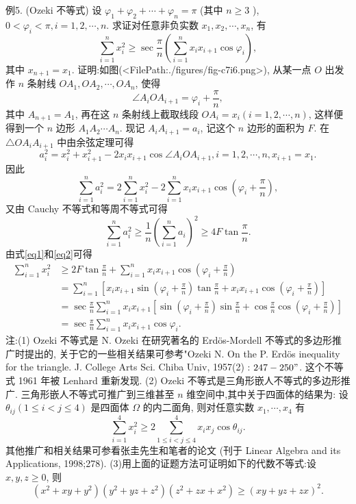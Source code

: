 例5. (Ozeki 不等式) 设 $\varphi_1+\varphi_2+\cdots+\varphi_n=\pi$ (其中 $n \geqslant 3$ ), $0<\varphi_i< \pi, i=1,2, \cdots, n$. 求证对任意非负实数 $x_1, x_2, \cdots, x_n$, 有
$$
\sum_{i=1}^n x_i^2 \geqslant \sec \frac{\pi}{n}\left(\sum_{i=1}^n x_i x_{i+1} \cos \varphi_i\right),
$$
其中 $x_{n+1}=x_1$.
证明:如图(<FilePath:./figures/fig-c7i6.png>), 从某一点 $O$ 出发作 $n$ 条射线 $O A_1, O A_2, \cdots, O A_n$, 使得
$$
\angle A_i O A_{i+1}=\varphi_i+\frac{\pi}{n},
$$
其中 $A_{n+1}=A_1$, 再在这 $n$ 条射线上截取线段 $O A_i=x_i(i=1,2, \cdots, n)$, 这样便得到一个 $n$ 边形 $A_1 A_2 \cdots A_n$.
现记 $A_i A_{i+1}=a_i$, 记这个 $n$ 边形的面积为 $F$.
在 $\triangle O A_i A_{i+1}$ 中由余弦定理可得
$$
a_i^2=x_i^2+x_{i+1}^2-2 x_i x_{i+1} \cos \angle A_i O A_{i+1}, i=1,2, \cdots, n, x_{i+1}=x_1 .
$$
因此
$$
\sum_{i=1}^n a_i^2=2 \sum_{i=1}^n x_i^2-2 \sum_{i=1}^n x_i x_{i+1} \cos \left(\varphi_i+\frac{\pi}{n}\right), \label{eq1}
$$
又由 Cauchy 不等式和等周不等式可得
$$
\sum_{i=1}^n a_i^2 \geqslant \frac{1}{n}\left(\sum_{i=1}^n a_i\right)^2 \geqslant 4 F \tan \frac{\pi}{n} . \label{eq2}
$$
由式\ref{eq1}和\ref{eq2}可得
$$
\begin{aligned}
\sum_{i=1}^n x_i^2 & \geqslant 2 F \tan \frac{\pi}{n}+\sum_{i=1}^n x_i x_{i+1} \cos \left(\varphi_i+\frac{\pi}{n}\right) \\
& =\sum_{i=1}^n\left[x_i x_{i+1} \sin \left(\varphi_i+\frac{\pi}{n}\right) \tan \frac{\pi}{n}+x_i x_{i+1} \cos \left(\varphi_i+\frac{\pi}{n}\right)\right] \\
& =\sec \frac{\pi}{n} \sum_{i=1}^n x_i x_{i+1}\left[\sin \left(\varphi_i+\frac{\pi}{n}\right) \sin \frac{\pi}{n}+\cos \frac{\pi}{n} \cos \left(\varphi_i+\frac{\pi}{n}\right)\right] \\
& =\sec \frac{\pi}{n} \sum_{i=1}^n x_i x_{i+1} \cos \varphi_i .
\end{aligned}
$$
注:(1) Ozeki 不等式是 N. Ozeki 在研究著名的 Erdös-Mordell 不等式的多边形推广时提出的, 关于它的一些相关结果可参考"Ozeki N. On the P. Erdös inequality for the triangle. J. College Arts Sci. Chiba Univ, 1957(2) : $247-250 "$. 这个不等式 1961 年被 Lenhard 重新发现.
(2) Ozeki 不等式是三角形嵌人不等式的多边形推广.
三角形嵌人不等式可推广到三维甚至 $n$ 维空间中,其中关于四面体的结果为:
设 $\theta_{i j}(1 \leqslant i<j \leqslant 4)$ 是四面体 $\Omega$ 的内二面角, 则对任意实数 $x_1, \cdots, x_4$ 有
$$
\sum_{i=1}^4 x_i^2 \geqslant 2 \sum_{1 \leqslant i<j \leqslant 4}^4 x_i x_j \cos \theta_{i j} .
$$
其他推广和相关结果可参看张圭先生和笔者的论文 (刊于 Linear Algebra and its Applications, 1998;278).
(3)用上面的证题方法可证明如下的代数不等式:设 $x, y, z \geqslant 0$, 则
$$
\left(x^2+x y+y^2\right)\left(y^2+y z+z^2\right)\left(z^2+z x+x^2\right) \geqslant(x y+y z+z x)^2 .
$$


